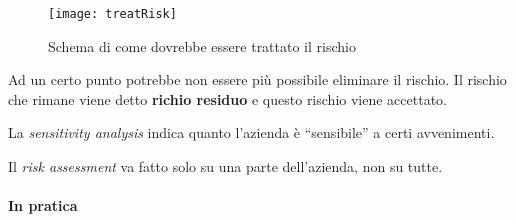 \begin{figure}[H]
 \centering
 \texttt{[image: treatRisk]}
 \caption{Schema di come dovrebbe essere trattato il rischio}
\end{figure}



Ad un certo punto potrebbe non essere più possibile eliminare il rischio. Il
rischio che rimane viene detto \textbf{richio residuo} e questo rischio viene
accettato.

La \textit{sensitivity analysis} indica quanto l'azienda è ``sensibile'' a certi
avvenimenti.

Il \textit{risk assessment} va fatto solo su una parte dell'azienda, non su
tutte.


\paragraph*{In pratica}

